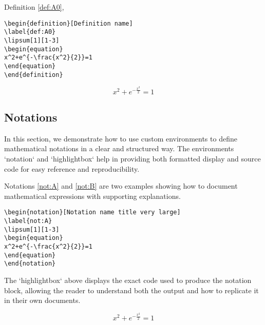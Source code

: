 Definition \ref{def:A0},

\begin{highlightbox}
\begin{verbatim}
\begin{definition}[Definition name]
\label{def:A0}
\lipsum[1][1-3]
\begin{equation}
x^2+e^{-\frac{x^2}{2}}=1
\end{equation}
\end{definition}
\end{verbatim}
\end{highlightbox}

\begin{definition}
\label{def:A0}
\lipsum[1][1-3]
\begin{equation}
x^2+e^{-\frac{x^2}{2}}=1
\end{equation}
\end{definition}




\subsection{Notations}

In this section, we demonstrate how to use custom environments to define mathematical notations in a clear and structured way.  
The environments `notation` and `highlightbox` help in providing both formatted display and source code for easy reference and reproducibility.

Notations \ref{not:A} and \ref{not:B} are two examples showing how to document mathematical expressions with supporting explanations.

\begin{highlightbox}
\begin{verbatim}
\begin{notation}[Notation name title very large]
\label{not:A}
\lipsum[1][1-3]
\begin{equation}
x^2+e^{-\frac{x^2}{2}}=1
\end{equation}
\end{notation}
\end{verbatim}
\end{highlightbox}
The `highlightbox` above displays the exact code used to produce the notation block, allowing the reader to understand both the output and how to replicate it in their own documents.
\begin{notation}
\label{not:A}
\lipsum[1][1-3]
\begin{equation}
x^2+e^{-\frac{x^2}{2}}=1
\end{equation}
\end{notation}

